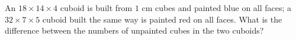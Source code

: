 An $18\times14\times4$ cuboid is built from $1$ cm cubes and painted blue on all faces; a $32\times7\times5$ cuboid built the same way is painted red on all faces. What is the difference between the numbers of unpainted cubes in the two cuboids?
